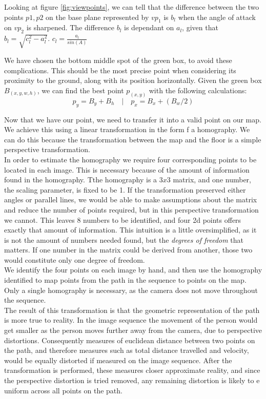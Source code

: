 Looking at figure \ref{fig:viewpoints}, we can tell that the difference between the two points \(p1,p2\) on the base plane represented by \(vp_1\) is \(b_l\) when the angle of attack on \(vp_2\) is sharpened. The difference \(b_l\) is dependant on \(a_l\), given that \(b_l = \sqrt{c_l^2-a_l^2}\). \(c_l = \frac{a_l}{sin(A)}\)\newline

We have chosen the bottom middle spot of the green box, to avoid these complications. This should be the most precise point when considering its proximity to the ground, along with its position horizontally. Given the green box \(B_(x,y,w,h)\), we can find the best point \(p_(x,y)\) with the following calculations:
\[p_y = B_y+B_h \quad | \quad p_x = B_x + (B_w / 2)\]

Now that we have our point, we need to transfer it into a valid point on our map. We achieve this using a linear transformation in the form f a homography. We can do this because the transformation between the map and the floor is a simple perspective transformation. \\
In order to estimate the homography we require four corresponding points to be located in each image. This is necessary because of the amount of information found in the homography. Tthe homography is a $3x3$ matrix, and one number, the scaling parameter, is fixed to be 1. If the transformation preserved either angles or parallel lines, we would be able to make assumptions about the matrix and reduce the number of points required, but in this perspective transformation we cannot. This leaves 8 numbers to be identified, and four 2d points offers exactly that amount of information. This intuition is a little oversimplified, as it is not the amount of numbers needed found, but the \textsl{degrees of freedom} that matters. If one number in the matrix could be derived from another, those two would constitute only one degree of freedom. \\
We identify the four points on each image by hand, and then use the homography identified to map points from the path in the sequence to points on the map. Only a single homography is necessary, as the camera does not move throughout the sequence. \\
The result of this transformation is that the geometric representation of the path is more true to reality. In the image sequence the movement of the person would get smaller as the person moves further away from the camera, due to perspective distortions. Consequently measures of euclidean distance between two points on the path, and therefore measures such as total distance travelled and velocity, would be equally distorted if measured on the image sequence. After the transformation is performed, these measures closer approximate reality, and since the perspective distortion is tried removed, any remaining distortion is likely to e uniform across all points on the path. 

